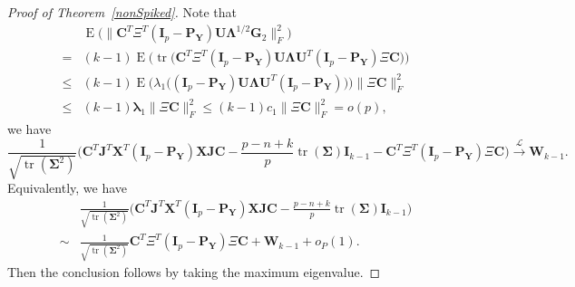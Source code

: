 \documentclass[12pt]{article} %
\DeclareMathOperator{\mytr}{tr}
\DeclareMathOperator{\myE}{E}
\newcommand{\bX}{\mathbf{X}}
\newcommand{\bP}{\mathbf{P}}
\newcommand{\bY}{\mathbf{Y}}
\newcommand{\bG}{\mathbf{G}}
\newcommand{\bJ}{\mathbf{J}}
\newcommand{\bC}{\mathbf{C}}
\newcommand{\bI}{\mathbf{I}}
\newcommand{\bU}{\mathbf{U}}
\newcommand{\bW}{\mathbf{W}}
\newcommand{\bfsym}[1]{\ensuremath{\boldsymbol{#1}}}
\def\blambda {\bfsym {\lambda}}
\def\bLambda {\bfsym {\Lambda}}
\def\bSigma {\bfsym {\Sigma}}
\theoremstyle{definition}
\begin{document}
\begin{proof}[\textrm{Proof of Theorem~\ref{nonSpiked}}]
    Note that
    $$
    \begin{aligned}
        &\myE\Big(\| \bC^T \Xi^T (\bI_p-\bP_{\bY})\bU\bLambda^{1/2}\bG_2\|_F^2\Big)\\
        = &
        (k-1)\myE \Big(\mytr\big(
        \bC^T \Xi^T (\bI_p-\bP_{\bY})\bU\bLambda \bU^T (\bI_p-\bP_{\bY})\Xi \bC
        \big)\Big)\\
        \leq &
        (k-1)\myE \Big(\lambda_1\big(
         (\bI_p-\bP_{\bY})\bU\bLambda \bU^T (\bI_p-\bP_{\bY})
        \big)\Big)
        \|\Xi \bC\|_F^2\\
        \leq &
        (k-1)\blambda_1\|\Xi \bC\|_F^2
        \leq 
        (k-1)c_1 \|\Xi \bC\|_F^2=o(p),
    \end{aligned}
    $$
    we have
    $$
    \frac{1}{\sqrt{\mytr(\bSigma^2)}}
    {\Big(\bC^T\bJ^T \bX^T(\bI_p-\bP_{\bY}) \bX \bJ\bC- \frac{p-n+k}{p}\mytr(\bSigma)\bI_{k-1}-\bC^T \Xi^T (\bI_p-\bP_{\bY})\Xi \bC}\Big)
    \xrightarrow{\mathcal{L}}\bW_{k-1}.
    $$
    Equivalently, we have
    $$
    \begin{aligned}
        &
    \frac{1}{\sqrt{\mytr(\bSigma^2)}}
        {\Big(\bC^T \bJ^T \bX^T(\bI_p-\bP_{\bY}) \bX \bJ\bC- \frac{p-n+k}{p}\mytr(\bSigma)\bI_{k-1}}\Big)\\
        \sim&
    \frac{1}{\sqrt{\mytr(\bSigma^2)}}
         \bC^T \Xi^T (\bI_p-\bP_{\bY})\Xi \bC
        +\bW_{k-1}+o_P(1).
    \end{aligned}
    $$
    Then the conclusion follows by taking the maximum eigenvalue.
\end{proof}
\end{document}
